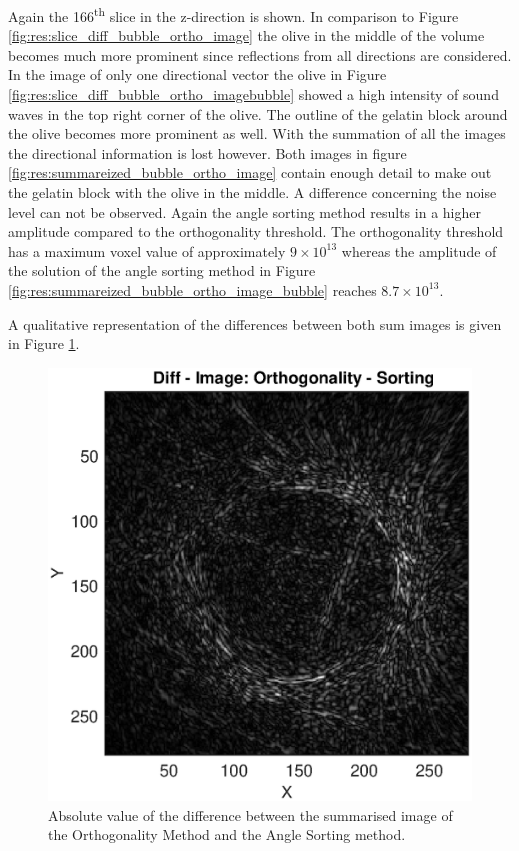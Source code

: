 Again the 166\textsuperscript{th} slice in the z-direction is shown. In comparison to Figure \ref{fig:res:slice_diff_bubble_ortho_image} the olive in the middle of the volume becomes much more prominent since reflections from all directions are considered. In the image of only one directional vector the olive in Figure \ref{fig:res:slice_diff_bubble_ortho_imagebubble} showed a high intensity of sound waves in the top right corner of the olive. The outline of the gelatin block around the olive becomes more prominent as well. With the summation of all the images the directional information is lost however. Both images in figure \ref{fig:res:summareized_bubble_ortho_image} contain enough detail to make out the gelatin block with the olive in the middle. A difference concerning the noise level can not be observed. Again the angle sorting method results in a higher amplitude compared to the orthogonality threshold. The orthogonality threshold has a maximum voxel value of approximately $9 \times 10^{13}$ whereas the amplitude of the solution of the angle sorting method in Figure \ref{fig:res:summareized_bubble_ortho_image_bubble} reaches $8.7 \times 10^{13}$. 

A qualitative representation of the differences between both sum images is given in Figure \ref{fig:diff_image}.

\begin{figure}[H]
    \centering
    \includegraphics[width=0.82\linewidth]{Graphics/Results/Diff_angle_sort_orthogonality/diff_ortho_bubble_diffimage.eps}
    \caption{Absolute value of the difference between the summarised image of the Orthogonality Method and the Angle Sorting method. }
    \label{fig:diff_image}
\end{figure}

